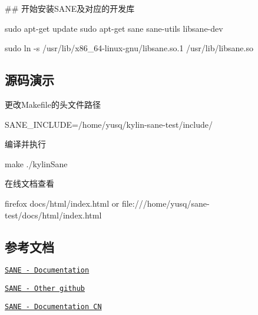 \#\# 开始安装\+S\+A\+N\+E及对应的开发库 
\begin{DoxyCode}
sudo apt-get update
sudo apt-get sane sane-utils libsane-dev

sudo ln -s /usr/lib/x86\_64-linux-gnu/libsane.so.1 /usr/lib/libsane.so
\end{DoxyCode}


\subsection*{源码演示}


\begin{DoxyEnumerate}
\item 更改\+Makefile的头文件路径 
\begin{DoxyCode}
SANE\_INCLUDE=/home/yusq/kylin-sane-test/include/
\end{DoxyCode}

\item 编译并执行 
\begin{DoxyCode}
make
./kylinSane
\end{DoxyCode}

\item 在线文档查看 
\begin{DoxyCode}
firefox docs/html/index.html
or
file:///home/yusq/sane-test/docs/html/index.html
\end{DoxyCode}

\end{DoxyEnumerate}

\subsection*{参考文档}


\begin{DoxyItemize}
\item \href{http://www.sane-project.org/docs.html}{\tt S\+A\+NE -\/ Documentation}
\item \href{https://github.com/yushulx/linux-document-scanning}{\tt S\+A\+NE -\/ Other github}
\item \href{https://blog.csdn.net/weixin_39743893/article/details/83350568}{\tt S\+A\+NE -\/ Documentation CN} 
\end{DoxyItemize}